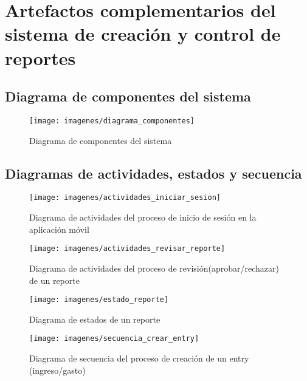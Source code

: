 \chapter{Artefactos complementarios del sistema de creación y control de reportes}

\section{Diagrama de componentes del sistema}

\begin{landscape}
\begin{figure}
  \centering
  \texttt{[image: imagenes/diagrama\_componentes]}
  \caption{Diagrama de componentes del sistema}
  \label{fig:componentesSistema}
\end{figure}
\end{landscape}


\section{Diagramas de actividades, estados y secuencia}

\begin{figure}[ht]
  \centering
  \texttt{[image: imagenes/actividades\_iniciar\_sesion]}
  \caption{Diagrama de actividades del proceso de inicio de sesión en la aplicación móvil}
  \label{fig:actividadesIniciarSesion}
\end{figure}

\begin{figure}[ht]
  \centering
  \texttt{[image: imagenes/actividades\_revisar\_reporte]}
  \caption{Diagrama de actividades del proceso de revisión(aprobar/rechazar) de un reporte}
  \label{fig:actividadesRevisarReporte}
\end{figure}


\begin{figure}[ht]
  \centering
  \texttt{[image: imagenes/estado\_reporte]}
  \caption{Diagrama de estados de un reporte}
  \label{fig:estadoReporte}
\end{figure}

\begin{landscape}
\begin{figure}
  \centering
  \texttt{[image: imagenes/secuencia\_crear\_entry]}
  \caption{Diagrama de secuencia del proceso de creación de un entry (ingreso/gasto)}
  \label{fig:secuenciaCrearEntry}
\end{figure}
\end{landscape}

